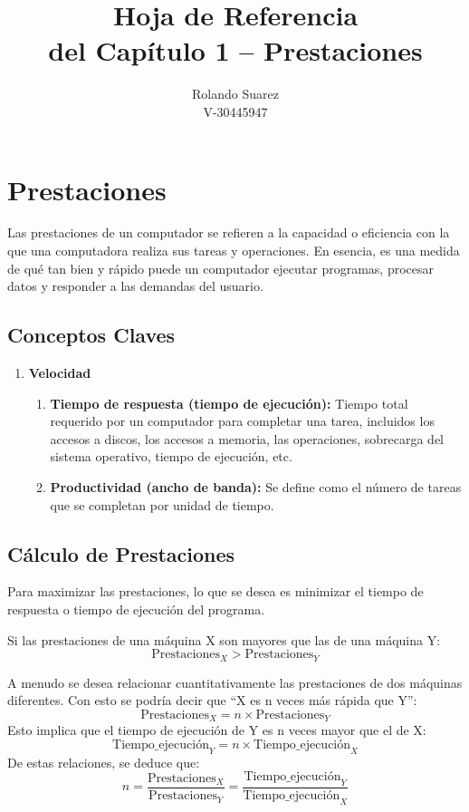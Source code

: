 \documentclass{article}
\title{Hoja de Referencia\\del Capítulo 1 – Prestaciones}
\author{Rolando Suarez\\
		V-30445947}
\date{}
\begin{document}
	
	\maketitle
	
	\section*{Prestaciones}
	Las prestaciones de un computador se refieren a la capacidad o eficiencia con la que una computadora realiza sus tareas y operaciones. En esencia, es una medida de qué tan bien y rápido puede un computador ejecutar programas, procesar datos y responder a las demandas del usuario.
	
	\subsection*{Conceptos Claves}
	\begin{enumerate}[label=\arabic*)]
		\item \textbf{Velocidad}
		\begin{enumerate}[label=\alph*., noitemsep]
			\item \textbf{Tiempo de respuesta (tiempo de ejecución):} Tiempo total requerido por un computador para completar una tarea, incluidos los accesos a discos, los accesos a memoria, las operaciones, sobrecarga del sistema operativo, tiempo de ejecución, etc.
			\item \textbf{Productividad (ancho de banda):} Se define como el número de tareas que se completan por unidad de tiempo.
		\end{enumerate}
	\end{enumerate}
	
	\subsection*{Cálculo de Prestaciones}
	Para maximizar las prestaciones, lo que se desea es minimizar el tiempo de respuesta o tiempo de ejecución del programa.
	
	Si las prestaciones de una máquina X son mayores que las de una máquina Y:
	\[ \text{Prestaciones}_X > \text{Prestaciones}_Y \]
	
	A menudo se desea relacionar cuantitativamente las prestaciones de dos máquinas diferentes. Con esto se podría decir que ``X es n veces más rápida que Y'':
	\[ \text{Prestaciones}_X = n \times \text{Prestaciones}_Y \]
	Esto implica que el tiempo de ejecución de Y es n veces mayor que el de X:
	\[ \text{Tiempo\_ejecución}_Y = n \times \text{Tiempo\_ejecución}_X \]
	De estas relaciones, se deduce que:
	\[ n = \frac{\text{Prestaciones}_X}{\text{Prestaciones}_Y} = \frac{\text{Tiempo\_ejecución}_Y}{\text{Tiempo\_ejecución}_X} \]
	
\end{document}
